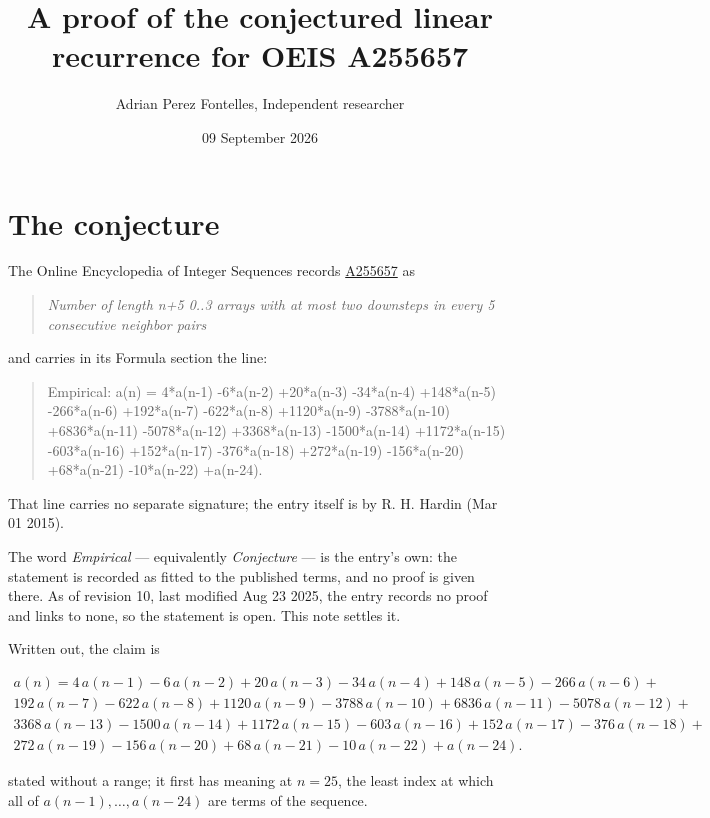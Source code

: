 \documentclass[11pt]{article}
\title{A proof of the conjectured linear recurrence for OEIS A255657}
\author{Adrian Perez Fontelles, Independent researcher}
\date{09 September 2026}
\theoremstyle{definition}
\begin{document}
\maketitle
\section{The conjecture}

The Online Encyclopedia of Integer Sequences records \href{https://oeis.org/A255657}{A255657} as

\begin{quote}\itshape Number of length n+5 0..3 arrays with at most two downsteps in every 5 consecutive neighbor pairs\end{quote}

and carries in its Formula section the line:

\begin{quote}\ttfamily Empirical: a(n) = 4*a(n-1) -6*a(n-2) +20*a(n-3) -34*a(n-4) +148*a(n-5) -266*a(n-6) +192*a(n-7) -622*a(n-8) +1120*a(n-9) -3788*a(n-10) +6836*a(n-11) -5078*a(n-12) +3368*a(n-13) -1500*a(n-14) +1172*a(n-15) -603*a(n-16) +152*a(n-17) -376*a(n-18) +272*a(n-19) -156*a(n-20) +68*a(n-21) -10*a(n-22) +a(n-24).\end{quote}

That line carries no separate signature; the entry itself is by R. H. Hardin (Mar 01 2015).

The word {\itshape Empirical} --- equivalently {\itshape Conjecture} --- is the entry's own: the statement is recorded as fitted to the published terms, and no proof is given there. As of revision 10, last modified Aug 23 2025, the entry records no proof and links to none, so the statement is open. This note settles it.

Written out, the claim is

\begin{multline*} a(n) = 4\,a(n-1) - 6\,a(n-2) + 20\,a(n-3) - 34\,a(n-4) + 148\,a(n-5) - 266\,a(n-6) + \\ 192\,a(n-7) - 622\,a(n-8) + 1120\,a(n-9) - 3788\,a(n-10) + 6836\,a(n-11) - 5078\,a(n-12) + \\ 3368\,a(n-13) - 1500\,a(n-14) + 1172\,a(n-15) - 603\,a(n-16) + 152\,a(n-17) - 376\,a(n-18) + \\ 272\,a(n-19) - 156\,a(n-20) + 68\,a(n-21) - 10\,a(n-22) + a(n-24). \end{multline*}

stated without a range; it first has meaning at $n = 25$, the least index at which all of $a(n-1),\dots,a(n-24)$ are terms of the sequence.
\end{document}
